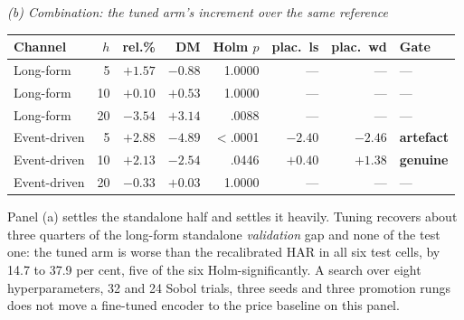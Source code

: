 \begin{table}[htbp]
\vspace{1.2ex}
\emph{(b) Combination: the tuned arm's increment over the same reference}\\[0.4ex]
\begin{tabular}{@{}lrrrrrrl@{}}
\toprule
Channel & $h$ & rel.\% & DM & Holm $p$ & plac.\ ls & plac.\ wd & Gate \\
\midrule
Long-form    &  5 & $+1.57$ & $-0.88$ & 1.0000 & --- & --- & --- \\
Long-form    & 10 & $+0.10$ & $+0.53$ & 1.0000 & --- & --- & --- \\
Long-form    & 20 & $-3.54$ & $+3.14$ & .0088  & --- & --- & --- \\
Event-driven &  5 & $+2.88$ & $-4.89$ & $<$.0001 & $-2.40$ & $-2.46$ & \textbf{artefact} \\
Event-driven & 10 & $+2.13$ & $-2.54$ & .0446  & $+0.40$ & $+1.38$ & \textbf{genuine} \\
Event-driven & 20 & $-0.33$ & $+0.03$ & 1.0000 & --- & --- & --- \\
\bottomrule
\end{tabular}
\end{table}

Panel (a) settles the standalone half and settles it heavily. Tuning
recovers about three quarters of the long-form standalone \emph{validation}
gap and none of the test one: the tuned arm is worse than the recalibrated
HAR in all six test cells, by 14.7 to 37.9 per cent, five of the six
Holm-significantly. A search over eight hyperparameters, 32 and 24 Sobol
trials, three seeds and three promotion rungs does not move a fine-tuned
encoder to the price baseline on this panel.

